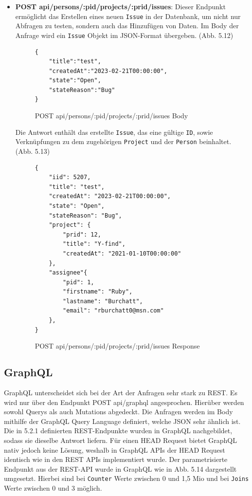 \begin{itemize}
\item \colorbox{gray!20}{\textbf{POST api/persons/:pid/projects/:prid/issues}}: Dieser Endpunkt ermöglicht das Erstellen eines neuen  \texttt{Issue} in der Datenbank, um nicht nur Abfragen zu testen, sondern auch das Hinzufügen von Daten. Im Body der Anfrage wird ein  \texttt{Issue} Objekt im JSON-Format übergeben. (Abb. 5.12) 
\newline
\begin{figure}[H]
\begin{center}
\begin{BVerbatim}
{
    "title":"test",
    "createdAt":"2023-02-21T00:00:00",
    "state":"Open",
    "stateReason":"Bug"
}
\end{BVerbatim}
\end{center}
\caption{POST api/persons/:pid/projects/:prid/issues Body}
\end{figure}
Die Antwort enthält das erstellte \texttt{Issue}, das eine gültige  \texttt{ID}, sowie Verknüpfungen zu dem zugehörigen  \texttt{Project} und der  \texttt{Person} beinhaltet. (Abb. 5.13)
\begin{figure}[H]
\begin{center}
\begin{BVerbatim}
{
    "iid": 5207,
    "title": "test",
    "createdAt": "2023-02-21T00:00:00",
    "state": "Open",
    "stateReason": "Bug",
    "project": {
        "prid": 12,
        "title": "Y-find",
        "createdAt": "2021-01-10T00:00:00"
    },
    "assignee"{
        "pid": 1,
        "firstname": "Ruby",
        "lastname": "Burchatt",
        "email": "rburchatt0@msn.com"
    },
}
\end{BVerbatim}
\end{center}
\caption{POST api/persons/:pid/projects/:prid/issues Response}
\end{figure}
\end{itemize}


\subsection{GraphQL}
GraphQL unterscheidet sich bei der Art der Anfragen sehr stark zu REST. Es wird nur über den Endpunkt \colorbox{gray!20}{POST api/graphql} angesprochen. Hierüber werden sowohl Querys als auch Mutations abgedeckt. Die Anfragen werden im Body mithilfe der GraphQL Query Language definiert, welche JSON sehr ähnlich ist. Die in 5.2.1 definierten REST-Endpunkte wurden in GraphQL nachgebildet, sodass sie dieselbe Antwort liefern. Für einen HEAD Request bietet GraphQL nativ jedoch keine Lösung, weshalb in GraphQL APIs der HEAD Request identisch wie in den REST APIs implementiert wurde.
Der parametrisierte Endpunkt aus der REST-API wurde in GraphQL wie in Abb. 5.14 dargestellt umgesetzt. Hierbei sind bei  \texttt{Counter} Werte zwischen 0 und 1,5 Mio und bei  \texttt{Joins} Werte zwischen 0 und 3 möglich.

